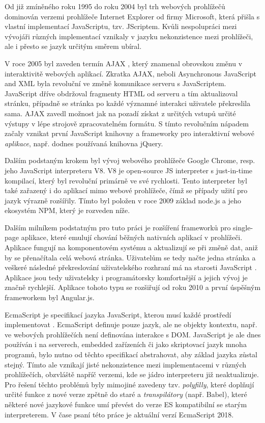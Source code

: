 Od již zmíněného roku 1995 do roku 2004 byl trh webových prohlížečů dominován verzemi prohlížeče Internet Explorer od firmy Microsoft, která přišla s vlastní implementací JavaScriptu, tzv. JScriptem. Kvůli nespolupráci mezi vývojáři různých implementací vznikaly v jazyku nekonzistence mezi prohlížeči, ale i přesto se jazyk určitým směrem ubíral.

V roce 2005 byl zaveden termín AJAX \cite{Garrett2005}, který znamenal obrovskou změnu v interaktivitě webových aplikací. Zkratka AJAX, neboli Asynchronous JavaScript and XML byla revoluční ve změně komunikace serveru s JavaScriptem. JavaScript dříve obdržoval fragmenty HTML od serveru a tím aktualizoval stránku, případně se stránka po každé významné interakci uživatele překreslila sama. AJAX zavedl možnost jak na pozadí získat z určitých vstupů určité výstupy v lépe strojově zpracovatelném formátu. S tímto revolučním nápadem začaly vznikat první JavaScript knihovny a frameworky pro interaktivní webové \emph{aplikace}, např. dodnes používaná knihovna jQuery.

Dalším podstaným krokem byl vývoj webového prohlížeče Google Chrome, resp. jeho JavaScript interpreteru V8. V8 je open-source JS interpreter s just-in-time kompilací, který byl revoluční primárně ve své rychlosti. Tento interpreter byl také zařazený i do aplikací mimo webové prohlížeče, čímž se případy užití pro jazyk výrazně rozšířily. Tímto byl položen v roce 2009 základ node.js \cite{satheesh2015web} a jeho ekosystém NPM, který je rozveden níže.

Dalším milníkem podstatným pro tuto práci je rozšíření frameworků pro single-page aplikace, které emulují chování běžných nativních aplikací v prohlížeči. Aplikace fungují na komponentovém systému a aktualizují se při změně dat, aniž by se přenačítala celá webová stránka. Uživatelům se tedy načte jedna stránka a veškeré následné překreslování uživatelského rozhraní má na starosti JavaScript \cite{fink2014pro}. Aplikace jsou tedy uživatelsky i programátorsky komfortnější a jejich vývoj je značně rychlejší. Aplikace tohoto typu se rozšiřují od roku 2010 a první úspěšným frameworkem byl Angular.js.


EcmaScript je specifikací jazyka JavaScript, kterou musí každé prostředí implementovat \cite{ecmascript}. EcmaScript definuje pouze jazyk, ale ne objekty kontextu, např. ve webových prohlížečích není definována interakce s DOM. JavaScript je ale dnes používán i na serverech, embedded zařízeních či jako skriptovací jazyk mnoha programů, bylo nutno od těchto specifikací abstrahovat, aby základ jazyka zůstal stejný. Tímto ale vznikají jisté nekonzistence mezi implementacemi v různých prohlížečích, obzvláště napříč verzemi, kde se jádro interpreteru již neaktualizuje. Pro řešení těchto problémů byly mimojiné zavedeny tzv. \emph{polyfilly}, které doplňují určité funkce z nové verze zpětně do staré a \emph{transpilátory} (např. Babel), které některé nové jazykové funkce umí převést do verze ES kompatibilní se starým interpreterem. V čase psaní této práce je aktuální verzí EcmaScript 2018.

